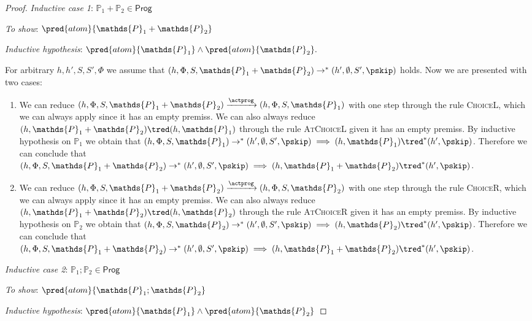 {\begin{proof}
\textit{Inductive case 1}: $\mathds{P}_1 + \mathds{P}_2 \in \mathsf{Prog}$

\textit{To show}: $\pred{atom}{\mathds{P}_1 + \mathds{P}_2}$

\textit{Inductive hypothesis}: $\pred{atom}{\mathds{P}_1} \land \pred{atom}{\mathds{P}_2}.$

For arbitrary $h, h', S, S', \Phi$ we assume that $(h, \Phi, S, \mathds{P}_1 + \mathds{P}_2) \rightarrow^* (h', \emptyset, S', \pskip)$ holds. Now we are presented with two cases:
\begin{enumerate}
\item We can reduce $(h, \Phi, S, \mathds{P}_1 + \mathds{P}_2) \xrightarrow{\actprog} (h, \Phi, S, \mathds{P}_1)$ with one step through the rule \textsc{ChoiceL}, which we can always apply since it has an empty premiss. We can also always reduce $(h, \mathds{P}_1 + \mathds{P}_2) \tred (h, \mathds{P}_1)$ through the rule \textsc{AtChoiceL} given it has an empty premiss. By inductive hypothesis on $\mathds{P}_1$ we obtain that $(h, \Phi, S, \mathds{P}_1) \rightarrow^* (h', \emptyset, S', \pskip) \implies (h, \mathds{P}_1) \tred^* (h', \pskip)$. Therefore we can conclude that $(h, \Phi, S, \mathds{P}_1 + \mathds{P}_2) \rightarrow^* (h', \emptyset, S', \pskip) \implies  (h, \mathds{P}_1 + \mathds{P}_2) \tred^* (h', \pskip)$.
\item We can reduce $(h, \Phi, S, \mathds{P}_1 + \mathds{P}_2) \xrightarrow{\actprog} (h, \Phi, S, \mathds{P}_2)$ with one step through the rule \textsc{ChoiceR}, which we can always apply since it has an empty premiss. We can also always reduce $(h, \mathds{P}_1 + \mathds{P}_2) \tred (h, \mathds{P}_2)$ through the rule \textsc{AtChoiceR} given it has an empty premiss. By inductive hypothesis on $\mathds{P}_2$ we obtain that $(h, \Phi, S, \mathds{P}_2) \rightarrow^* (h', \emptyset, S', \pskip) \implies (h, \mathds{P}_2) \tred^* (h', \pskip)$. Therefore we can conclude that $(h, \Phi, S, \mathds{P}_1 + \mathds{P}_2) \rightarrow^* (h', \emptyset, S', \pskip) \implies  (h, \mathds{P}_1 + \mathds{P}_2) \tred^* (h', \pskip)$. \\
\end{enumerate}

\textit{Inductive case 2}: $\mathds{P}_1 ; \mathds{P}_2 \in \mathsf{Prog}$

\textit{To show}: $\pred{atom}{\mathds{P}_1 ; \mathds{P}_2}$

\textit{Inductive hypothesis}: $\pred{atom}{\mathds{P}_1} \land \pred{atom}{\mathds{P}_2}$


\end{proof}}
